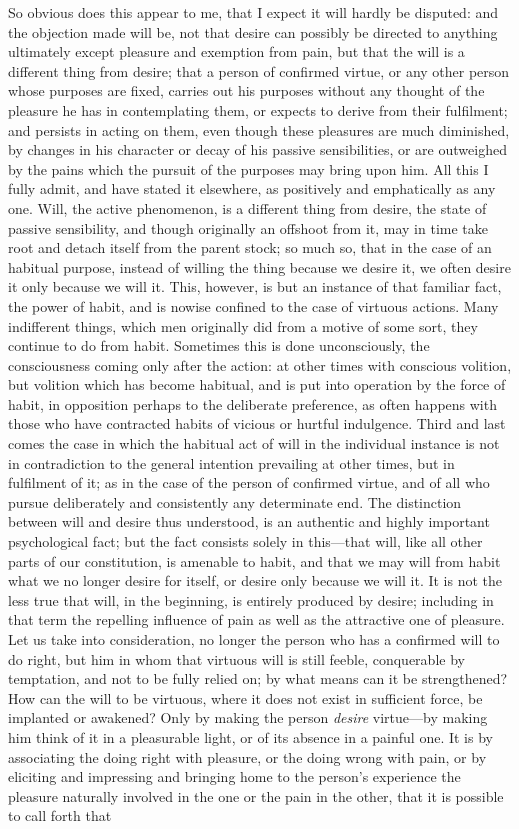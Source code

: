 \documentclass[12pt]{report}
\begin{document}
So obvious does this appear to me, that I expect it will hardly be disputed: and the objection made will be, not that desire can possibly be directed to anything ultimately except pleasure and exemption from pain, but that the will is a different thing from desire; that a person of confirmed virtue, or any other person whose purposes are fixed, carries out his purposes without any thought of the pleasure he has in contemplating them, or expects to derive from their fulfilment; and persists in acting on them, even though these pleasures are much diminished, by changes in his character or decay of his passive sensibilities, or are outweighed by the pains which the pursuit of the purposes may bring upon him. All this I fully admit, and have stated it elsewhere, as positively and emphatically as any one. Will, the active phenomenon, is a different thing from desire, the state of passive sensibility, and though originally an offshoot from it, may in time take root and detach itself from the parent stock; so much so, that in the case of an habitual purpose, instead of willing the thing because we desire it, we often desire it only because we will it. This, however, is but an instance of that familiar fact, the power of habit, and is nowise confined to the case of virtuous actions. Many indifferent things, which men originally did from a motive of some sort, they continue to do from habit. Sometimes this is done unconsciously, the consciousness coming only after the action: at other times with conscious volition, but volition which has become habitual, and is put into operation by the force of habit, in opposition perhaps to the deliberate preference, as often happens with those who have contracted habits of vicious or hurtful indulgence. Third and last comes the case in which the habitual act of will in the individual instance is not in contradiction to the general intention prevailing at other times, but in fulfilment of it; as in the case of the person of confirmed virtue, and of all who pursue deliberately and consistently any determinate end. The distinction between will and desire thus understood, is an authentic and highly important psychological fact; but the fact consists solely in this—that will, like all other parts of our constitution, is amenable to habit, and that we may will from habit what we no longer desire for itself, or desire only because we will it. It is not the less true that will, in the beginning, is entirely produced by desire; including in that term the repelling influence of pain as well as the attractive one of pleasure. Let us take into consideration, no longer the person who has a confirmed will to do right, but him in whom that virtuous will is still feeble, conquerable by temptation, and not to be fully relied on; by what means can it be strengthened? How can the will to be virtuous, where it does not exist in sufficient force, be implanted or awakened? Only by making the person \emph{desire} virtue—by making him think of it in a pleasurable light, or of its absence in a painful one. It is by associating the doing right with pleasure, or the doing wrong with pain, or by eliciting and impressing and bringing home to the person's experience the pleasure naturally involved in the one or the pain in the other, that it is possible to call forth that 
\end{document}
